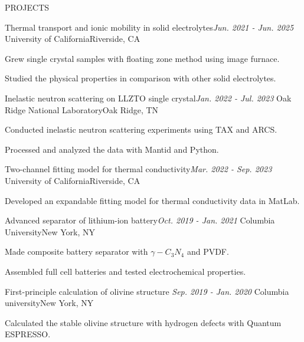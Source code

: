 \documentclass{resume} %
\begin{document}
\begin{rSection}{PROJECTS}
    
\begin{rSubsection}
    {Thermal transport and ionic mobility in solid electrolytes}{\em Jun. 2021 - Jun. 2025}
    {University of California}{Riverside, CA}
\item Grew single crystal samples with floating zone method using image furnace.
\item Studied the physical properties in comparison with other solid electrolytes.
\end{rSubsection}

\begin{rSubsection}
    {Inelastic neutron scattering on LLZTO single crystal}{\em Jan. 2022 - Jul. 2023}
    {Oak Ridge National Laboratory}{Oak Ridge, TN}
    \item Conducted inelastic neutron scattering experiments using TAX and ARCS.
    \item Processed and analyzed the data with Mantid and Python.
\end{rSubsection}

\begin{rSubsection}
    {Two-channel fitting model for thermal conductivity}{\em Mar. 2022 - Sep. 2023}
    {University of California}{Riverside, CA}
\item Developed an expandable fitting model for thermal conductivity data in MatLab.
\end{rSubsection}

\begin{rSubsection}
{Advanced separator of lithium-ion battery}{\em Oct. 2019 - Jan. 2021}
{Columbia University}{New York, NY}
 \item Made composite battery separator with $\gamma-C_3 N_4$ and PVDF.
 \item Assembled full cell batteries and tested electrochemical properties.
\end{rSubsection}


\begin{rSubsection}
{First-principle calculation of olivine structure }{\em Sep. 2019 - Jan. 2020}
{Columbia university}{New York, NY}
\item Calculated the stable olivine structure with hydrogen defects with Quantum ESPRESSO.
\end{rSubsection}



\end{rSection}
\end{document}
